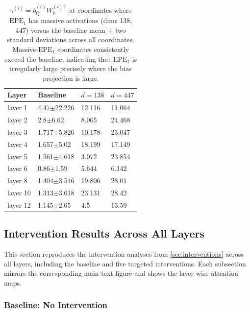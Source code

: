 \documentclass[11pt]{article}
\begin{document}
\begin{table}[t]
  \centering
  \begin{tabular}{llll}
    \hline
    \textbf{Layer} & \textbf{Baseline} & \textbf{$d{=}138$} & \textbf{$d{=}447$}\\
    \hline
    layer 1   &   4.47$\pm$22.226 &  12.116   &    11.064        \\
    layer 2   &   2.8$\pm$6.62    &    8.065   &    24.468         \\
    layer 3   &   1.717$\pm$5.826 &    10.178  &    23.047        \\
    layer 4   &   1.657$\pm$5.02  &   18.199   &     17.149         \\
    layer 5   &   1.561$\pm$4.618 &    3.072   &    23.854          \\
    layer 6   &   0.86$\pm$1.59   &    5.644   &    6.142          \\
    layer 8   &   1.404$\pm$3.546 &    19.806  &    28.01          \\
    layer 10  &   1.313$\pm$3.618 &    23.131  &    28.42        \\
    layer 12   &   1.145$\pm$2.65 &    4.5  &    13.59         \\

    \hline
  \end{tabular}
  \caption{$\gamma^{(i)}=b_Q^{(i)}W_k^{(i)\top}$ at coordinates where $\mathrm{EPE}_1$ has massive activations (dims 138, 447) versus the baseline mean $\pm$ two standard deviations across all coordinates. Massive-$\mathrm{EPE}_1$ coordinates consistently exceed the baseline, indicating that $\mathrm{EPE}_1$ is irregularly large precisely where the bias projection is large.}
  \label{tab:appendix_coor_align}
\end{table}

\subsection{Intervention Results Across All Layers}\label{app:interventions}

This section reproduces the intervention analyses from \cref{sec:interventions} across all layers, including the baseline and five targeted interventions. Each subsection mirrors the corresponding main-text figure and shows the layer-wise attention maps.

\subsubsection{Baseline: No Intervention}\label{app:no_intervention}
\end{document}
